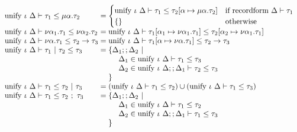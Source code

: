 \documentclass[sigplan,screen]{acmart}
\begin{document}
\begin{figure*}[h]
\[\begin{array}{l @{} l}
      \\
      \text{unify } \iota\ \Delta \vdash
      \tau_1 \leq \mu \alpha . \tau_2
      &{} = 
      \begin{cases}  
        \text{unify } \iota\ \Delta \vdash 
        \tau_1 \leq \tau_2[\alpha\mapsto\mu\alpha.\tau_2]	
        &\text{if }
        \text{recordform } \Delta \vdash \tau_1
        \\
        \{\}
        &\text{otherwise}
      \end{cases}

      \\
      \text{unify } \iota\ \Delta \vdash
      \nu \alpha_1 . \tau_1 \leq 
      \nu \alpha_2 . \tau_2	
      &{} = 
      \text{unify } \iota\ \Delta \vdash 
      \tau_1[\alpha_1\mapsto\nu\alpha_1.\tau_1] \leq 
      \tau_2[\alpha_2\mapsto\nu\alpha_1.\tau_1]

      \\
      \text{unify } \iota\ \Delta \vdash
      \nu \alpha . \tau_1 \leq 
      \tau_2 \rightarrow \tau_3
      &{} = 
      \text{unify } \iota\ \Delta \vdash
      \tau_1[\alpha\mapsto\nu\alpha.\tau_1]
      \leq 
      \tau_2 \rightarrow \tau_3

      \\
      \text{unify } \iota\ \Delta \vdash
      \tau_1\ |\ \tau_2 \leq \tau_3
      &{} = 
      \begin{array}[t]{@{} l}
        \{\Delta_1;;\Delta_2\ |
        \\ 
        \ \ \ \ \Delta_1 \in \text{unify } \iota\ \Delta \vdash \tau_1 \leq \tau_3
        \\
        \ \ \ \ \Delta_2 \in \text{unify } \iota\ \Delta;;\Delta_1 \vdash \tau_2 \leq \tau_3
        \\
        \}
      \end{array}

      \\
      \text{unify } \iota\ \Delta \vdash
      \tau_1 \leq \tau_2 \ |\ \tau_3
      &{} = 
      (\text{unify } \iota\ \Delta \vdash \tau_1 \leq \tau_2)
      \cup
      (\text{unify } \iota\ \Delta \vdash \tau_1 \leq \tau_3)

      \\
      \text{unify } \iota\ \Delta \vdash
      \tau_1 \leq \tau_2\ ;\ \tau_3
      &{} = 
      \begin{array}[t]{@{} l}
        \{\Delta_1;;\Delta_2\ |
        \\ 
        \ \ \ \ \Delta_1 \in \text{unify } \iota\ \Delta \vdash \tau_1 \leq \tau_2
        \\
        \ \ \ \ \Delta_2 \in \text{unify } \iota\ \Delta;;\Delta_1 \vdash \tau_1 \leq \tau_3
        \\
        \}
      \end{array}


\end{array}\]
\end{figure*}
\end{document}
